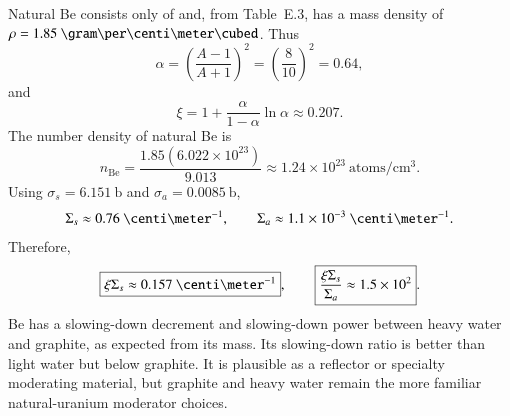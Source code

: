 \begin{adaptedsolution}
Natural Be consists only of  and, from Table~E.3, has a mass
density of $\rho=1.85~\gram\per\centi\meter\cubed$.  Thus
\[
 \alpha=\left(\frac{A-1}{A+1}\right)^2
       =\left(\frac{8}{10}\right)^2=0.64,
\]
and
\[
 \boxed{\xi
 =1+\frac{\alpha}{1-\alpha}\ln\alpha
 \approx0.207}.
\]
The number density of natural Be is
\[
 n_{\mathrm{Be}}
 =\frac{1.85(6.022\times10^{23})}{9.013}
 \approx1.24\times10^{23}~\mathrm{atoms/cm^3}.
\]
Using $\sigma_s=6.151~\mathrm b$ and $\sigma_a=0.0085~\mathrm b$,
\[
 \Sigma_s\approx0.76~\centi\meter^{-1},
 \qquad
 \Sigma_a\approx1.1\times10^{-3}~\centi\meter^{-1}.
\]
Therefore,
\[
 \boxed{\xi\Sigma_s\approx0.157~\centi\meter^{-1}},
 \qquad
 \boxed{\frac{\xi\Sigma_s}{\Sigma_a}\approx1.5\times10^2}.
\]
Be has a slowing-down decrement and slowing-down power between heavy water and
graphite, as expected from its mass.  Its slowing-down ratio is better than
light water but below graphite.  It is plausible as a reflector or specialty
moderating material, but graphite and heavy water remain the more familiar
natural-uranium moderator choices.
\end{adaptedsolution}

\clearpage
